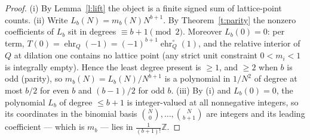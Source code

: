 \documentclass[11pt]{article}
\numberwithin{equation}{section}
\theoremstyle{definition}
\theoremstyle{remark}
\begin{document}
\begin{proof}
(i) By Lemma~\ref{l:lift} the object is a finite signed sum
of lattice-point counts. (ii) Write
$L_b(N)=m_b(N)N^{b+1}$. By Theorem~\ref{t:parity} the
nonzero coefficients of $L_b$ sit in degrees
$\equiv b+1\pmod2$. Moreover $L_b(0)=0$: per term,
$T(0)=\operatorname{ehr}_Q(-1)
=(-1)^{b+1}\operatorname{ehr}_Q^{\circ}(1)$, and the
relative interior of $Q$ at dilation one contains no lattice
point (any strict unit constraint $0<m_i<1$ is integrally
empty). Hence the least degree present is $\ge1$, and
$\ge2$ when $b$ is odd (parity), so
$m_b(N)=L_b(N)/N^{b+1}$ is a polynomial in $1/N^{2}$ of
degree at most $b/2$ for even $b$ and $(b-1)/2$ for odd $b$.
(iii) By (i) and $L_b(0)=0$, the polynomial $L_b$ of degree
$\le b+1$ is integer-valued at all nonnegative integers, so
its coordinates in the binomial basis
$\binom N0,\dots,\binom N{b+1}$ are integers and its leading
coefficient --- which is $m_b$ --- lies in
$\tfrac1{(b+1)!}\mathbb Z$.
\end{proof}
\end{document}
